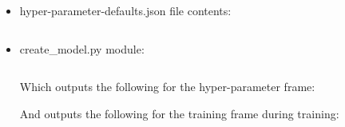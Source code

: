 \documentclass[./project-report/src/latex/project-report.tex]{subfiles}
\begin{document}
\begin{itemize}
    \item hyper-parameter-defaults.json file contents:
        \inputminted{json}{./school_project/frames/hyper-parameter-defaults.json}
    \item create\_model.py module:
        \label{sec:create_model-module}
        \inputminted{python}{./school_project/frames/create_model.py}
        
        Which outputs the following for the hyper-parameter frame:

        \pagebreak
        
        \begin{figure}[h!]
        \centering
        \end{figure}

        And outputs the following for the training frame during training:

        \begin{figure}[h!]
        \centering
        \end{figure}


\end{itemize}
\end{document}
